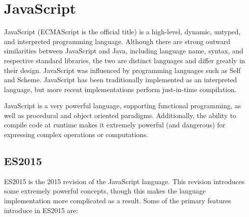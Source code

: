 \section{JavaScript}

JavaScript (ECMAScript is the official title) is a high-level, dynamic, untyped, and interpreted programming language. Although there are strong outward similarities between JavaScript and Java, including language name, syntax, and respective standard libraries, the two are distinct languages and differ greatly in their design. JavaScript was influenced by programming languages such as Self and Scheme. JavaScript has been traditionally implemented as an interpreted language, but more recent implementations perform just-in-time compilation. %

JavaScript is a very powerful language, supporting functional programming, as well as procedural and object oriented paradigms.  Additionally, the ability to compile code at runtime makes it extremely powerful (and dangerous) for expressing complex operations or computations.  

\subsection{ES2015}
ES2015 is the 2015 revision of the JavaScript language. This revision introduces some extremely powerful concepts, though this makes the language implementation more complicated as a result.  Some of the primary features introduce in ES2015 are:

